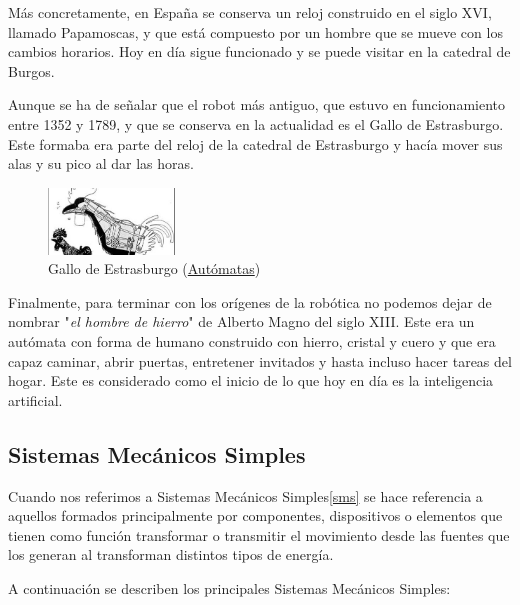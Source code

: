Más concretamente, en España se conserva un reloj construido en el siglo XVI, llamado Papamoscas,  y que está compuesto por un hombre que se mueve con los cambios horarios. Hoy en día sigue funcionado y se puede visitar en la catedral de Burgos.


Aunque se ha de señalar que el robot más antiguo, que estuvo en funcionamiento entre 1352 y 1789, y que se conserva en la actualidad es el Gallo de Estrasburgo. Este formaba era parte del reloj de la catedral de Estrasburgo y hacía mover sus alas y su pico al dar las horas.

\begin{figure}[H]
\begin{center}
  \includegraphics[width=0.3\textwidth]{./EtapaPrimeriza/imagenes/gallo.jpg}
  \caption{Gallo de Estrasburgo  (\href{http://lasmilrespuestas.blogspot.com/2012/06/como-funcionaban-los-automatas.html} {Autómatas})}
  \label{gallo}
\end{center}
\end{figure}


Finalmente, para terminar con los orígenes de la robótica no podemos dejar de nombrar "\textit{el hombre de hierro}" de Alberto Magno del siglo XIII. Este era un autómata con forma de humano construido con hierro, cristal y cuero y que era capaz caminar, abrir puertas, entretener invitados y hasta incluso hacer tareas del hogar. Este es considerado como el inicio de lo que hoy en día es la inteligencia artificial.


\subsection{Sistemas Mecánicos Simples}

Cuando nos referimos a Sistemas Mecánicos Simples\ref{sms} se hace referencia a aquellos formados principalmente por componentes, dispositivos o elementos que tienen como función transformar o transmitir el movimiento desde las fuentes que los generan al transforman distintos tipos de energía.

A continuación se describen los principales Sistemas Mecánicos Simples:

